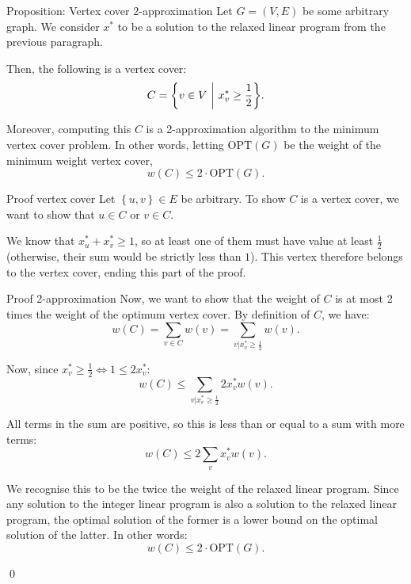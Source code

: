 \documentclass[a4paper]{article}
\begin{document}
\begin{parag}{Proposition: Vertex cover $2$-approximation}
    Let $G = \left(V, E\right)$ be some arbitrary graph. We consider $x^*$ to be a solution to the relaxed linear program from the previous paragraph.

    Then, the following is a vertex cover:
    \[C = \left\{v \in V \suchthat x_v^* \geq \frac{1}{2}\right\}.\]

    Moreover, computing this $C$ is a 2-approximation algorithm to the minimum vertex cover problem. In other words, letting $\text{OPT}\left(G\right)$ be the weight of the minimum weight vertex cover,
    \[w\left(C\right) \leq 2\cdot \text{OPT}\left(G\right).\]

    \begin{subparag}{Proof vertex cover}
        Let $\left\{u, v\right\} \in E$ be arbitrary. To show $C$ is a vertex cover, we want to show that $u \in C$ or $v \in C$.

        We know that $x_u^* + x_v^* \geq 1$, so at least one of them must have value at least $\frac{1}{2}$ (otherwise, their sum would be strictly less than $1$). This vertex therefore belongs to the vertex cover, ending this part of the proof.
    \end{subparag}

    \begin{subparag}{Proof 2-approximation}
        Now, we want to show that the weight of $C$ is at most 2 times the weight of the optimum vertex cover. By definition of $C$, we have:
        \[w\left(C\right) = \sum_{v \in C} w\left(v\right) = \sum_{v | x^*_v \geq \frac{1}{2}} w\left(v\right).\]


        Now, since $x_v^* \geq \frac{1}{2} \iff 1 \leq 2 x_v^*$:
        \[w\left(C\right) \leq \sum_{v | x^*_v \geq \frac{1}{2}} 2 x_v^* w\left(v\right).\]

        All terms in the sum are positive, so this is less than or equal to a sum with more terms: 
        \[w\left(C\right) \leq 2\sum_{v} x_v^* w\left(v\right).\]

        We recognise this to be the twice the weight of the relaxed linear program. Since any solution to the integer linear program is also a solution to the relaxed linear program, the optimal solution of the former is a lower bound on the optimal solution of the latter. In other words: 
        \[w\left(C\right) \leq 2 \cdot \text{OPT}\left(G\right).\]

        \qed
    \end{subparag}
\end{parag}
\end{document}
